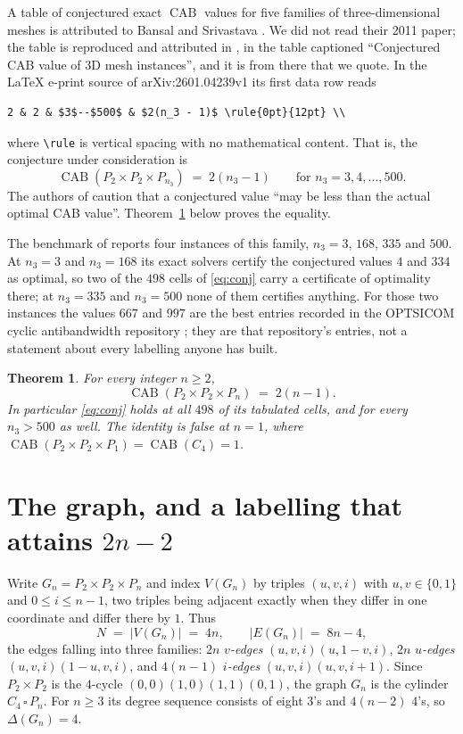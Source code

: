 \documentclass[11pt]{amsart}
\newtheorem{theorem}{Theorem}
\DeclareMathOperator{\CAB}{CAB}
\begin{document}
A table of conjectured exact $\CAB$ values for five families of three-dimensional meshes is
attributed to Bansal and Srivastava \cite{BansalSrivastava}. We did not read their 2011 paper; the
table is reproduced and attributed in \cite{SAT2026}, in the table
captioned ``Conjectured CAB value of 3D mesh instances'', and it is from there that we quote. In
the \LaTeX{} e-print source of
arXiv:2601.04239v1 its first data row reads
\begin{verbatim}
2 & 2 & $3$--$500$ & $2(n_3 - 1)$ \rule{0pt}{12pt} \\
\end{verbatim}
where \verb|\rule| is vertical spacing with no mathematical content. That is, the conjecture under
consideration is
\begin{equation}\label{eq:conj}
  \CAB(P_2\times P_2\times P_{n_3}) \;=\; 2(n_3-1)
  \qquad\text{for } n_3 = 3,4,\dots,500 .
\end{equation}
The authors of \cite{SAT2026} caution that a conjectured value ``may be less than the actual optimal
CAB value''. Theorem~\ref{thm:main} below proves the equality.

The benchmark of \cite{SAT2026} reports four instances of this family, $n_3 = 3$, $168$, $335$ and
$500$. At $n_3 = 3$ and $n_3 = 168$ its exact solvers certify the conjectured values $4$ and $334$
as optimal, so two of the $498$ cells of \eqref{eq:conj} carry a certificate of optimality there;
at $n_3 = 335$ and $n_3 = 500$ none of them certifies anything. For those two instances the values
$667$ and $997$ are the best entries recorded in the OPTSICOM cyclic antibandwidth repository
\cite{Optsicom}; they are that repository's entries, not a statement about every labelling anyone
has built.

\begin{theorem}\label{thm:main}
For every integer $n \ge 2$,
\[
  \CAB(P_2\times P_2\times P_n) \;=\; 2(n-1).
\]
In particular \eqref{eq:conj} holds at all $498$ of its tabulated cells, and for every $n_3 > 500$
as well. The identity is false at $n=1$, where $\CAB(P_2\times P_2\times P_1) = \CAB(C_4) = 1$.
\end{theorem}

\section{The graph, and a labelling that attains \texorpdfstring{$2n-2$}{2n-2}}

Write $G_n = P_2\times P_2\times P_n$ and index $V(G_n)$ by triples $(u,v,i)$ with $u,v\in\{0,1\}$
and $0\le i\le n-1$, two triples being adjacent exactly when they differ in one coordinate and
differ there by $1$. Thus
\[
  N \;=\; |V(G_n)| \;=\; 4n, \qquad |E(G_n)| \;=\; 8n-4,
\]
the edges falling into three families: $2n$ \emph{$v$-edges} $(u,v,i)(u,1-v,i)$, $2n$
\emph{$u$-edges} $(u,v,i)(1-u,v,i)$, and $4(n-1)$ \emph{$i$-edges} $(u,v,i)(u,v,i+1)$. Since
$P_2\times P_2$ is the $4$-cycle $(0,0)(1,0)(1,1)(0,1)$, the graph $G_n$ is the cylinder
$C_4\,\square\,P_n$. For $n\ge3$ its degree sequence consists of eight $3$'s and $4(n-2)$ $4$'s, so
$\Delta(G_n) = 4$.
\end{document}
